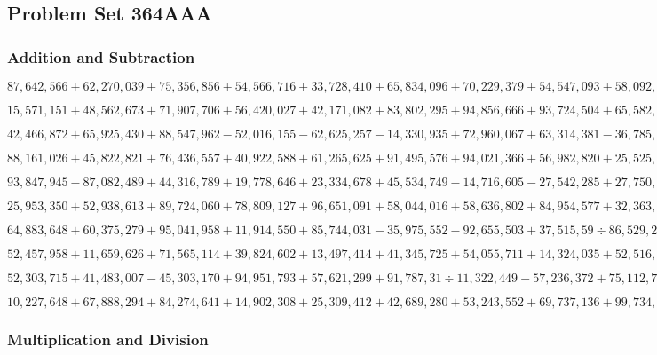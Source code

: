 \hypertarget{problem-set-364aaa}{%
\subsection{Problem Set 364AAA}\label{problem-set-364aaa}}

\hypertarget{addition-and-subtraction}{%
\subsubsection{Addition and
Subtraction}\label{addition-and-subtraction}}

\(87,642,566+62,270,039+75,356,856+54,566,716+33,728,410+65,834,096+70,229,379+54,547,093+58,092,249+66,111,029\)

\(15,571,151+48,562,673+71,907,706+56,420,027+42,171,082+83,802,295+94,856,666+93,724,504+65,582,403+94,873,967\)

\(42,466,872+65,925,430+88,547,962-52,016,155-62,625,257-14,330,935+72,960,067+63,314,381-36,785,041+33,297,188\)

\(88,161,026+45,822,821+76,436,557+40,922,588+61,265,625+91,495,576+94,021,366+56,982,820+25,525,376+65,715,522\)

\(93,847,945-87,082,489+44,316,789+19,778,646+23,334,678+45,534,749-14,716,605-27,542,285+27,750,023-33,331,888\)

\(25,953,350+52,938,613+89,724,060+78,809,127+96,651,091+58,044,016+58,636,802+84,954,577+32,363,054+65,312,919\)

\(64,883,648+60,375,279+95,041,958+11,914,550+85,744,031-35,975,552-92,655,503+37,515,59÷86,529,280-69,959,961\)

\(52,457,958+11,659,626+71,565,114+39,824,602+13,497,414+41,345,725+54,055,711+14,324,035+52,516,904+18,547,249\)

\(52,303,715+41,483,007-45,303,170+94,951,793+57,621,299+91,787,31÷11,322,449-57,236,372+75,112,721-82,484,277\)

\(10,227,648+67,888,294+84,274,641+14,902,308+25,309,412+42,689,280+53,243,552+69,737,136+99,734,199+57,377,271\)

\hypertarget{multiplication-and-division}{%
\subsubsection{Multiplication and
Division}\label{multiplication-and-division}}

